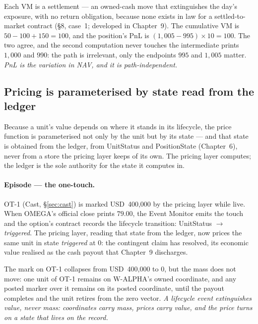 \documentclass[11pt,a4paper]{article}
\newcommand{\USD}[1]{\mbox{USD~#1}}
\begin{document}
Each VM is a settlement --- an owned-cash move that extinguishes the day's
exposure, with no return obligation, because none exists in law for a
settled-to-market contract (§8, case~1; developed in Chapter~9). The
cumulative VM is $50 - 100 + 150 = 100$, and the position's PnL is
$(1{,}005 - 995)\times 10 = 100$. The two agree, and the second computation
never touches the intermediate prints $1{,}000$ and $990$: the path is
irrelevant, only the endpoints $995$ and $1{,}005$ matter.
\emph{PnL is the variation in NAV, and it is path-independent.}

\subsection{Pricing is parameterised by state read from the ledger}\label{sec:pricing-state}

Because a unit's value depends on where it stands in its lifecycle, the price
function is parameterised not only by the unit but by its state --- and that
state is obtained from the ledger, from UnitStatus and PositionState
(Chapter~6), never from a store the pricing layer keeps of its own. The pricing
layer computes; the ledger is the sole authority for the state it computes in.

\paragraph{Episode --- the one-touch.}
OT-1 (Cast, \S\ref{sec:cast}) is marked \USD{400,000} by the pricing layer while
live. When OMEGA's official close prints $79.00$, the Event Monitor
emits the touch and the option's contract records the lifecycle transition:
UnitStatus $\rightarrow$ \emph{triggered}. The pricing layer, reading that
state from the ledger, now prices the same unit in state \emph{triggered} at
$0$: the contingent claim has resolved, its economic value realised as the
cash payout that Chapter~9 discharges.

The mark on OT-1 collapses from \USD{400,000} to $0$, but the mass does not
move: one unit of OT-1 remains on W-ALPHA's owned coordinate, and any posted
marker over it remains on its posted coordinate, until the payout completes and
the unit retires from the zero vector. \emph{A lifecycle event extinguishes
value, never mass: coordinates carry mass, prices carry value, and the price
turns on a state that lives on the record.}
\end{document}
